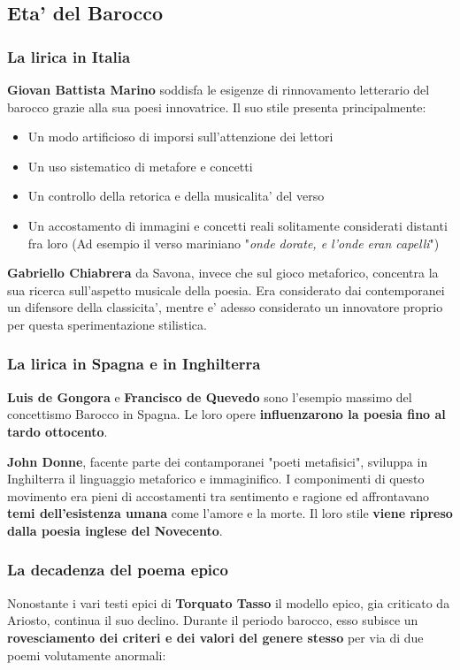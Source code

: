 \documentclass{article}
\begin{document}
  {
    \subsection{Eta' del Barocco}
    \subsubsection{La lirica in Italia}
    \textbf{Giovan Battista Marino} soddisfa le esigenze di rinnovamento letterario del barocco grazie alla sua poesi innovatrice. Il suo stile presenta principalmente:
    
    \begin{itemize}
      \item Un modo artificioso di imporsi sull'attenzione dei lettori
      \item Un uso sistematico di metafore e concetti
      \item Un controllo della retorica e della musicalita' del verso
      \item Un accostamento di immagini e concetti reali solitamente considerati distanti fra loro \small{(Ad esempio il verso mariniano "\textit{onde dorate, e l'onde eran capelli}")}
    \end{itemize}

    \textbf{Gabriello Chiabrera} da Savona, invece che sul gioco metaforico, concentra la sua ricerca sull'aspetto musicale della poesia. Era considerato dai contemporanei un difensore della classicita', mentre e' adesso considerato un innovatore proprio per questa sperimentazione stilistica.

    \subsubsection{La lirica in Spagna e in Inghilterra}
    \textbf{Luis de Gongora} e \textbf{Francisco de Quevedo} sono l'esempio massimo del concettismo Barocco in Spagna. Le loro opere \textbf{influenzarono la poesia fino al tardo ottocento}.

    \textbf{John Donne}, facente parte dei contamporanei "poeti metafisici", sviluppa in Inghilterra il linguaggio metaforico e immaginifico. I componimenti di questo movimento era pieni di accostamenti tra sentimento e ragione ed affrontavano \textbf{temi dell'esistenza umana} come l'amore e la morte. Il loro stile \textbf{viene ripreso dalla poesia inglese del Novecento}.
    
    \subsubsection{La decadenza del poema epico}
    Nonostante i vari testi epici di \textbf{Torquato Tasso} il modello epico, gia criticato da Ariosto, continua il suo declino. Durante il periodo barocco, esso subisce un \textbf{rovesciamento dei criteri e dei valori del genere stesso} per via di due poemi volutamente anormali:
    
}
\end{document}
